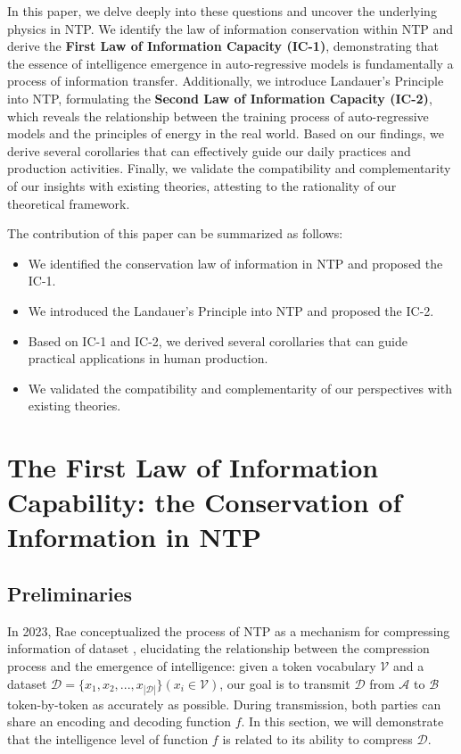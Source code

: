 \documentclass{article}
\theoremstyle{plain}
\theoremstyle{definition}
\theoremstyle{remark}
\begin{document}
In this paper, we delve deeply into these questions and uncover the underlying physics in NTP. We identify the law of information conservation \cite{info_conservation_2013} within NTP and derive the \textbf{First Law of Information Capacity (IC-1)}, demonstrating that the essence of intelligence emergence in auto-regressive models is fundamentally a process of information transfer. Additionally, we introduce Landauer's Principle \cite{5392446} into NTP, formulating the \textbf{Second Law of Information Capacity (IC-2)}, which reveals the relationship between the training process of auto-regressive models and the principles of energy in the real world. Based on our findings, we derive several corollaries that can effectively guide our daily practices and production activities. Finally, we validate the compatibility and complementarity of our insights with existing theories, attesting to the rationality of our theoretical framework.

The contribution of this paper can be summarized as follows:

\begin{itemize}
    \item We identified the conservation law of information in NTP and proposed the IC-1.
    \item We introduced the Landauer's Principle into NTP and proposed the IC-2.
    \item Based on IC-1 and IC-2, we derived several corollaries that can guide practical applications in human production.
    \item We validated the compatibility and complementarity of our perspectives with existing theories.
\end{itemize}

\section{The First Law of Information Capability: the Conservation of Information in NTP}

\subsection{Preliminaries}

In 2023, Rae conceptualized the process of NTP as a mechanism for compressing information of dataset \cite{AGI_2023}, elucidating the relationship between the compression process and the emergence of intelligence: given a token vocabulary $\mathcal{V}$ and a dataset $\mathcal{D}=\{x_1, x_2, ..., x_{|\mathcal{D}|}\} (x_i \in \mathcal{V})$, our goal is to transmit $\mathcal{D}$ from $\mathcal{A}$ to $\mathcal{B}$ token-by-token as accurately as possible. During transmission, both parties can share an encoding and decoding function $f$. In this section, we will demonstrate that the intelligence level of function $f$ is related to its ability to compress $\mathcal{D}$.
\end{document}
